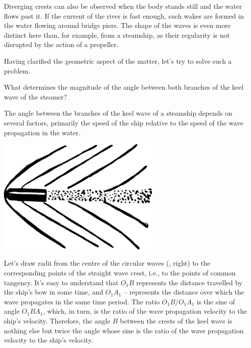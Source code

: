 Diverging crests can also be observed when the body stands still and the water flows past it. If the current of the river is fast enough, such wakes are formed in the water flowing around bridge piers. The shape of the waves is even more distinct here than, for example, from a steamship, as their regularity is not disrupted by the action of a propeller.

Having clarified the geometric aspect of the matter, let's try to solve such a problem.

\ques What determines the magnitude of the angle between both branches of the keel wave of the steamer?

\ans The angle between the branches of the keel wave of a steamship depends on several factors, primarily the speed of the ship relative to the speed of the wave propagation in the water.

\begin{marginfigure}[-4cm]%
\centering
\includegraphics[width=0.6\textwidth]{figures/ch-02/fig-050.pdf}
\end{marginfigure}

Let's draw radii from the centre of the circular waves (, right) to the corresponding points of the straight wave crest, i.e., to the points of common tangency. It's easy to understand that $O_{1}B$ represents the distance travelled by the ship's bow in some time, and $O_{1}A_{1}$ -- represents the distance over which the wave propagates in the same time period. The ratio $O_{1}B/O_{1}A_{1}$ is the sine of angle $O_{1}BA_{1}$, which, in turn, is the ratio of the wave propagation velocity to the ship's velocity. Therefore, the angle $B$ between the crests of the keel wave is nothing else but twice the angle whose sine is the ratio of the wave propagation velocity to the ship's velocity.

